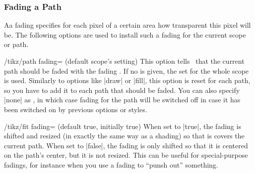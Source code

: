 \subsubsection{Fading a Path}

Aa fading specifies for each pixel of a certain area how transparent
this pixel will be. The following options are used to install such a
fading for the current scope or path. 


\begin{key}{/tikz/path fading= (default \normalfont scope's setting)}
  This option tells \tikzname\ that the current path should be faded
  with the fading . If no  is given, the 
   set for the whole scope is used. Similarly to options
  like |draw| or |fill|, this option is reset for each path, so you
  have to add it to each path that should be faded. You can also
  specify |none| as , in which case fading for the path
  will be switched off in case it has been switched on by previous
  options or styles.
\begin{codeexample}[]
\end{codeexample}

  \begin{key}{/tikz/fit fading= (default true, initially true)}
    When set to |true|, the fading is shifted and resized (in exactly
    the same way as a shading) so that is covers the current
    path. When set to |false|, the fading is only shifted so that it
    is centered on the path's center, but it is not resized. This can
    be useful for special-purpose fadings, for instance when you use a
    fading to ``punsh out'' something.
  \end{key}


\end{key}
